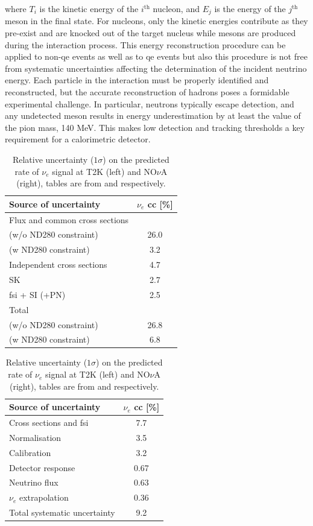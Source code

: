 where $T_i$ is the kinetic energy of the $i^\text{th}$ nucleon, and $E_j$ is the energy of the $j^\text{th}$ meson in the final state. For nucleons, only the kinetic energies contribute as they pre-exist and are knocked out of the target nucleus while mesons are produced during the interaction process.
This energy reconstruction procedure can be applied to non-\acrshort{qe} events as well as to \acrshort{qe} events but also this procedure is not free from systematic uncertainties affecting the determination of the incident neutrino energy. Each particle in the interaction must be properly identified and reconstructed, but the accurate reconstruction of hadrons poses a formidable experimental challenge. In particular, neutrons typically escape detection, and any undetected meson results in energy underestimation by at least the value of the pion mass, 140 MeV. This makes low detection and tracking thresholds a key requirement for a calorimetric detector.


\begin{table}[t]
\caption[T2K and NO$\nu$A Systematics]{Relative uncertainty ($1\sigma$) on the predicted rate of $\nu_e$ signal at T2K (left) and NO$\nu$A (right), tables are from \cite{t2k_systs} and \cite{nova_systs} respectively.}
\label{tab:t2k_nova_systs}
\centering
\footnotesize
\begin{tabular}[b]{l c}
\toprule
Source of uncertainty            & $\nu_e$ \acrshort{cc} [\%]  \\
\midrule
Flux and common cross sections   &   \\
(w/o ND280 constraint)           &  26.0  \\
(w ND280 constraint)             & 3.2  \\
\midrule
Independent cross sections       &  4.7  \\
\midrule
SK                               & 2.7  \\
\acrshort{fsi} + SI (+PN)                   &  2.5  \\
\midrule
Total                            &   \\
(w/o ND280 constraint)           &  26.8  \\
(w ND280 constraint)             & 6.8 \\
\bottomrule
\end{tabular}
\begin{tabular}[b]{l c}
\toprule
Source of uncertainty            & $\nu_e$ \acrshort{cc} [\%] \\
\midrule
Cross sections and \acrshort{fsi}           & 7.7  \\
Normalisation                    & 3.5  \\
Calibration                      & 3.2  \\
Detector response                & 0.67  \\
Neutrino flux                    & 0.63  \\
$\nu_e$ extrapolation            & 0.36  \\
\midrule
Total systematic uncertainty     & 9.2  \\
\bottomrule
\end{tabular}
\end{table}

